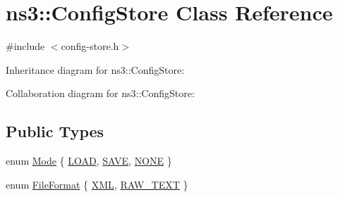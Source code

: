 \hypertarget{classns3_1_1ConfigStore}{}\section{ns3\+:\+:Config\+Store Class Reference}
\label{classns3_1_1ConfigStore}


{\ttfamily \#include $<$config-\/store.\+h$>$}



Inheritance diagram for ns3\+:\+:Config\+Store\+:


Collaboration diagram for ns3\+:\+:Config\+Store\+:
\subsection*{Public Types}
\begin{DoxyCompactItemize}
\item 
enum \hyperlink{classns3_1_1ConfigStore_a3d4a0f3b64adcf3d5468419dca8c1b07}{Mode} \{ \hyperlink{classns3_1_1ConfigStore_a3d4a0f3b64adcf3d5468419dca8c1b07acbf52831ceacb59f36f502c8f993f7eb}{L\+O\+AD}, 
\hyperlink{classns3_1_1ConfigStore_a3d4a0f3b64adcf3d5468419dca8c1b07ad890041eb8798761a606ab2b06f76cc0}{S\+A\+VE}, 
\hyperlink{classns3_1_1ConfigStore_a3d4a0f3b64adcf3d5468419dca8c1b07a5df85830f731a6a051ca5b0f93fd4fb0}{N\+O\+NE}
 \}
\item 
enum \hyperlink{classns3_1_1ConfigStore_ac60fd234eb07b100f16833c166f8f507}{File\+Format} \{ \hyperlink{classns3_1_1ConfigStore_ac60fd234eb07b100f16833c166f8f507a52e8fefce8b5da7c59c1f89001b77b82}{X\+ML}, 
\hyperlink{classns3_1_1ConfigStore_ac60fd234eb07b100f16833c166f8f507a431827066198120ce78007cfa6595a1d}{R\+A\+W\+\_\+\+T\+E\+XT}
 \}
\end{DoxyCompactItemize}
